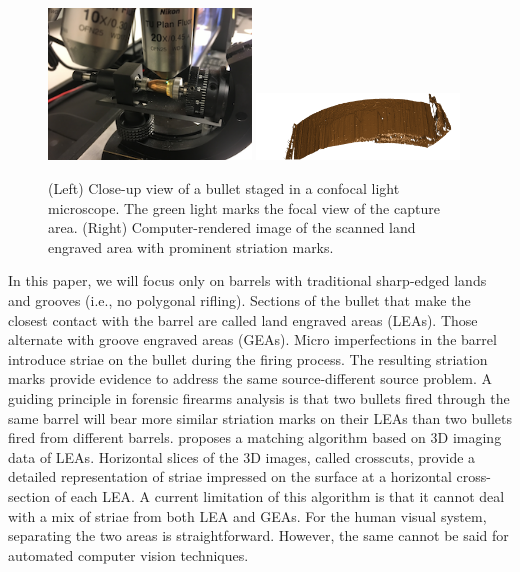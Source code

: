 \documentclass[12pt]{article}
\begin{document}
\begin{figure}

{\centering \includegraphics[width=0.48\textwidth]{./images/microscope-small} \includegraphics[width=0.48\textwidth]{./images/HS44-Br1-B1-L2} 

}

\caption{\label{microscope}(Left) Close-up view of a bullet staged in a confocal light microscope. The green light marks the focal view of the capture area. (Right) Computer-rendered image of the scanned land engraved area with prominent striation marks.}\label{fig:microscope}
\end{figure}

In this paper, we will focus only on barrels with traditional
sharp-edged lands and grooves (i.e., no polygonal rifling). Sections of
the bullet that make the closest contact with the barrel are called land
engraved areas (LEAs). Those alternate with groove engraved areas
(GEAs). Micro imperfections in the barrel introduce striae on the bullet
during the firing process. The resulting striation marks provide
evidence to address the same source-different source problem. A guiding
principle in forensic firearms analysis is that two bullets fired
through the same barrel will bear more similar striation marks on their
LEAs than two bullets fired from different barrels. \citet{Hare1}
proposes a matching algorithm based on 3D imaging data of LEAs.
Horizontal slices of the 3D images, called crosscuts, provide a detailed
representation of striae impressed on the surface at a horizontal
cross-section of each LEA. A current limitation of this algorithm is
that it cannot deal with a mix of striae from both LEA and GEAs. For the
human visual system, separating the two areas is straightforward.
However, the same cannot be said for automated computer vision
techniques.
\end{document}
